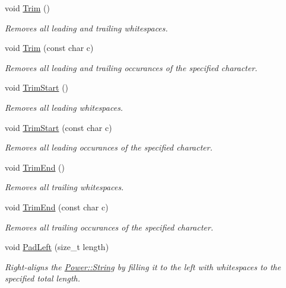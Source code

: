 \begin{DoxyCompactItemize}
void \hyperlink{class_power_1_1_string_adccf591064c5f8a4681930a01318e023}{Trim} ()
\begin{DoxyCompactList}\small\item\em Removes all leading and trailing whitespaces. \end{DoxyCompactList}\item 
void \hyperlink{class_power_1_1_string_afd78e65baee3fdbd249616dd03ee6eaa}{Trim} (const char c)
\begin{DoxyCompactList}\small\item\em Removes all leading and trailing occurances of the specified character. \end{DoxyCompactList}\item 
void \hyperlink{class_power_1_1_string_ac83fee188935bfea5a486d135f8e39e3}{Trim\+Start} ()
\begin{DoxyCompactList}\small\item\em Removes all leading whitespaces. \end{DoxyCompactList}\item 
void \hyperlink{class_power_1_1_string_ae4130f9754a9f1f6a2570a13429cb3d0}{Trim\+Start} (const char c)
\begin{DoxyCompactList}\small\item\em Removes all leading occurances of the specified character. \end{DoxyCompactList}\item 
void \hyperlink{class_power_1_1_string_afd4d38398e47c0ab873e90431396663b}{Trim\+End} ()
\begin{DoxyCompactList}\small\item\em Removes all trailing whitespaces. \end{DoxyCompactList}\item 
void \hyperlink{class_power_1_1_string_aedaa5e01d3bc63c803e8c379477ba114}{Trim\+End} (const char c)
\begin{DoxyCompactList}\small\item\em Removes all trailing occurances of the specified character. \end{DoxyCompactList}\item 
void \hyperlink{class_power_1_1_string_a7f70e85bdbec97cc247d08ba74cb00ed}{Pad\+Left} (size\+\_\+t length)
\begin{DoxyCompactList}\small\item\em Right-\/aligns the \hyperlink{class_power_1_1_string}{Power\+::\+String} by filling it to the left with whitespaces to the specified total length. \end{DoxyCompactList}\item 

\end{DoxyCompactItemize}
